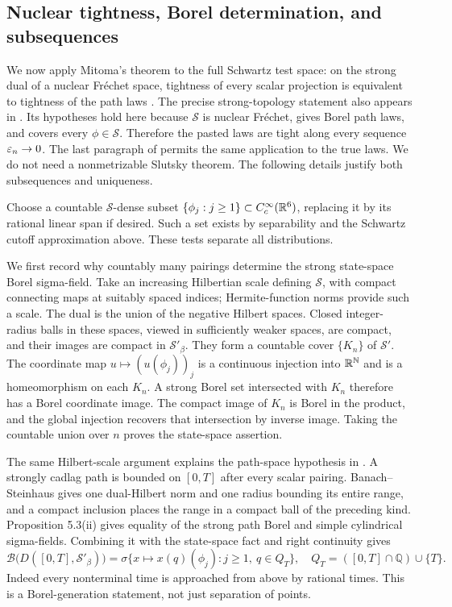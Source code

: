 \subsection{Nuclear tightness, Borel determination, and subsequences}

We now apply Mitoma's theorem to the full Schwartz test space:
on the strong dual of a nuclear Fr\'echet space, tightness of every
scalar projection is equivalent to tightness of the path laws
\cite{Mitoma}. The precise strong-topology statement also appears in
\cite[\S5.II, Theorem 5.5]{Jakubowski}.
Its hypotheses hold here because $\mathcal S$ is nuclear Fr\'echet,
 gives Borel path laws, and
 covers every $\phi\in\mathcal S$.
Therefore the pasted laws are tight along every sequence $\varepsilon_n\to0$.
The last paragraph of  permits the same
application to the true laws. We do not need a nonmetrizable Slutsky
theorem. The following details justify both subsequences and uniqueness.

Choose a countable $\mathcal S$-dense subset
$\{\phi_j:j\geq1\}\subset C_c^\infty(\mathbb R^6)$, replacing it by its
rational linear span if desired. Such a set exists by separability
and the Schwartz cutoff approximation above. These tests separate
all distributions.

We first record why countably many pairings determine the strong
state-space Borel sigma-field. Take an increasing Hilbertian scale
defining $\mathcal S$, with compact connecting maps at suitably
spaced indices; Hermite-function norms provide such a scale.
The dual is the union of the negative Hilbert spaces.
Closed integer-radius balls in these spaces, viewed in sufficiently
weaker spaces, are compact, and their images are compact in
$\mathcal S'_\beta$. They form a countable cover $\{K_n\}$ of
$\mathcal S'$.
The coordinate map $u\mapsto(u(\phi_j))_j$ is a continuous injection
into $\mathbb R^{\mathbb N}$ and is a homeomorphism on each $K_n$.
A strong Borel set intersected with $K_n$ therefore has a Borel
coordinate image. The compact image of $K_n$ is Borel in the product,
and the global injection recovers that intersection by inverse image.
Taking the countable union over $n$ proves the state-space assertion.

The same Hilbert-scale argument explains the path-space hypothesis in
\cite[Proposition 5.3]{Jakubowski}. A strongly cadlag path is bounded
on $[0,T]$ after every scalar pairing. Banach--Steinhaus gives one
dual-Hilbert norm and one radius bounding its entire range, and a
compact inclusion places the range in a compact ball of the preceding
kind. Proposition 5.3(ii) gives equality of the strong path Borel
and simple cylindrical sigma-fields. Combining it with the state-space
fact and right continuity gives
\begin{equation}\label{eq:tempered-path-borel}
 \mathcal B\bigl(D([0,T],\mathcal S'_\beta)\bigr)
 =\sigma\{x\mapsto x(q)(\phi_j):j\geq1,\ q\in Q_T\},
 \quad Q_T=([0,T]\cap\mathbb Q)\cup\{T\}.
\end{equation}
Indeed every nonterminal time is approached from above by rational
times. This is a Borel-generation statement, not just separation of
points.

